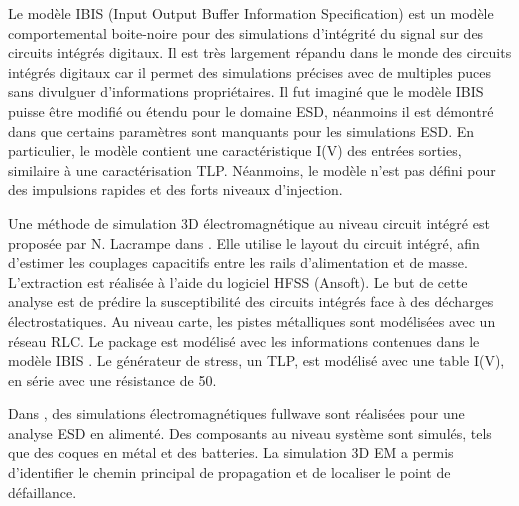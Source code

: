 Le modèle IBIS (Input Output Buffer Information Specification) \cite{ibis-spec} est un modèle comportemental boite-noire pour des simulations d'intégrité du signal sur des circuits intégrés digitaux.
Il est très largement répandu dans le monde des circuits intégrés digitaux car il permet des simulations précises avec de multiples puces sans divulguer d'informations propriétaires.
Il fut imaginé que le modèle IBIS puisse être modifié ou étendu pour le domaine ESD, néanmoins il est démontré dans  \cite{ibisImprovementFabrice} que certains paramètres sont manquants pour les simulations ESD.
En particulier, le modèle contient une caractéristique I(V) des entrées sorties, similaire à une caractérisation TLP.
Néanmoins, le modèle n'est pas défini pour des impulsions rapides et des forts niveaux d'injection.

Une méthode de simulation 3D électromagnétique au niveau circuit intégré est proposée par N. Lacrampe dans \cite{LacrampeTransientImmunity}.
Elle utilise le layout du circuit intégré, afin d'estimer les couplages capacitifs entre les rails d'alimentation et de masse.
L'extraction est réalisée à l'aide du logiciel HFSS (Ansoft).
Le but de cette analyse est de prédire la susceptibilité des circuits intégrés face à des décharges électrostatiques.
Au niveau carte, les pistes métalliques sont modélisées avec un réseau RLC.
Le package est modélisé avec les informations contenues dans le modèle IBIS \cite{ibis-spec}.
Le générateur de stress, un TLP, est modélisé avec une table I(V), en série avec une résistance de 50\textOmega{}.

Dans \cite{softFailMobile}, des simulations électromagnétiques fullwave sont réalisées pour une analyse ESD en alimenté.
Des composants au niveau système sont simulés, tels que des coques en métal et des batteries.
La simulation 3D EM a permis d'identifier le chemin principal de propagation et de localiser le point de défaillance.
